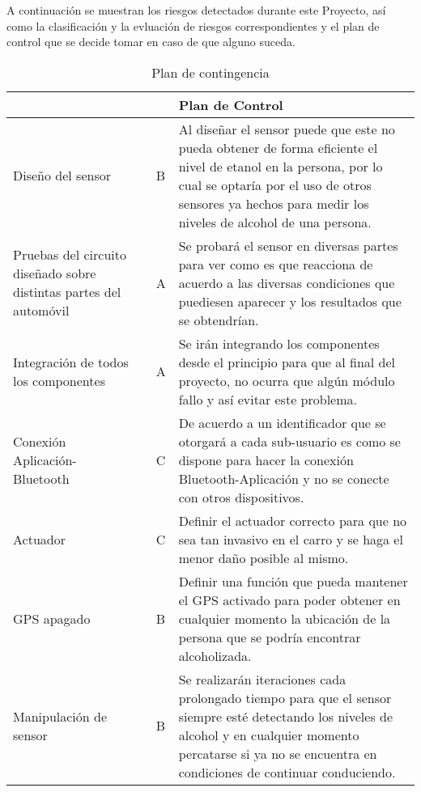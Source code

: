 A continuación se muestran los riesgos detectados durante este Proyecto, así como la clasificación y la evluación de riesgos correspondientes y el plan de control que se decide tomar en caso de que alguno suceda.

\begin{center}
\begin{table}[!htb]
\centering
\begin{tabular}{|p{4cm}|p{2cm}|p{2cm}|p{5cm}|}
    \hline
    \centering {\bfseries Tipo de Riesgo}  & \centering {\bfseries CR} & \centering {\bfseries VR} & {\bfseries Plan de Control} \\ \hline
    
    \centering Diseño del sensor & \centering 2 & \centering B & Al diseñar el sensor puede que este no pueda obtener de forma eficiente el nivel de etanol en la persona, por lo cual se optaría por el uso de otros sensores ya hechos para medir los niveles de alcohol de una persona.\\ \hline
    
    \centering Pruebas del circuito diseñado sobre distintas partes del automóvil & \centering 1 & \centering A & Se probará el sensor en diversas partes para ver como es que reacciona de acuerdo a las diversas condiciones que puediesen aparecer y los resultados que se obtendrían.\\ \hline
    
    \centering Integración de todos los componentes & \centering 3 & \centering A & Se irán integrando los componentes desde el principio para que al final del proyecto, no ocurra que algún módulo fallo y así evitar este problema.\\ \hline
    
    \centering Conexión Aplicación-Bluetooth & \centering 2 & \centering C & De acuerdo a un identificador que se otorgará a cada sub-usuario es como se dispone para hacer la conexión Bluetooth-Aplicación y no se conecte con otros dispositivos.\\ \hline
    
    \centering Actuador & \centering 2 & \centering C & Definir el actuador correcto para que no sea tan invasivo en el carro y se haga el menor daño posible al mismo.\\ \hline
    
    \centering GPS apagado & \centering 3 & \centering B & Definir una función que pueda mantener el GPS activado para poder obtener en cualquier momento la ubicación de la persona que se podría encontrar alcoholizada.\\ \hline
    
    \centering Manipulación de sensor & \centering 3 & \centering B & Se realizarán iteraciones cada prolongado tiempo para que el sensor siempre esté detectando los niveles de alcohol y en cualquier momento percatarse si ya no se encuentra en condiciones de continuar conduciendo.\\ \hline

\end{tabular}
\caption{Plan de contingencia}
\label{tabla:pobconlimsincolo}
\end{table}
\end{center}
